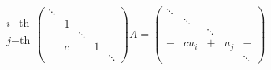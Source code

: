 \begin{enumerate}
\[\left.\begin{array}{c} \\ i\mathrm{-th}\\ \\j\mathrm{-th} \\ \\\end{array}\right.\left(\begin{array}{ccccc}\ddots&&&& \\&1&&& \\&&\ddots && \\&c&&1& \\&&&&\ddots \end{array}\right)A=\left(\begin{array}{ccccc}\ddots&&&& \\&\ddots&&& \\&&\ddots && \\-&cu_i&+&u_j& -\\&&&&\ddots \end{array}\right)\]


\end{enumerate}
